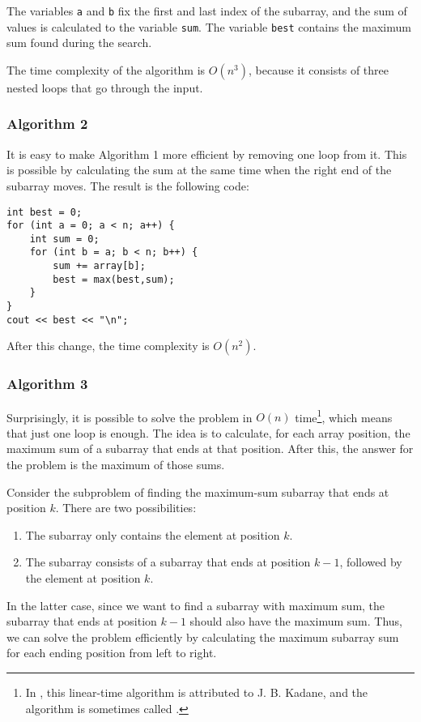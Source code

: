 The variables \texttt{a} and \texttt{b} fix the first and
last index of the subarray,
and the sum of values is calculated to the variable \texttt{sum}.
The variable \texttt{best} contains the maximum sum found during the search.

The time complexity of the algorithm is $O(n^3)$,
because it consists of three nested loops
that go through the input.

\subsubsection{Algorithm 2}

It is easy to make Algorithm 1 more efficient
by removing one loop from it.
This is possible by calculating the sum at the same
time when the right end of the subarray moves.
The result is the following code:

\begin{lstlisting}
int best = 0;
for (int a = 0; a < n; a++) {
    int sum = 0;
    for (int b = a; b < n; b++) {
        sum += array[b];
        best = max(best,sum);
    }
}
cout << best << "\n";
\end{lstlisting}
After this change, the time complexity is $O(n^2)$.

\subsubsection{Algorithm 3}

Surprisingly, it is possible to solve the problem
in $O(n)$ time\footnote{In \cite{ben86}, this linear-time algorithm
is attributed to J. B. Kadane, and the algorithm is sometimes
called  .}, which means
that just one loop is enough.
The idea is to calculate, for each array position,
the maximum sum of a subarray that ends at that position.
After this, the answer for the problem is the
maximum of those sums.

Consider the subproblem of finding the maximum-sum subarray
that ends at position $k$.
There are two possibilities:
\begin{enumerate}
\item The subarray only contains the element at position $k$.
\item The subarray consists of a subarray that ends
at position $k-1$, followed by the element at position $k$.
\end{enumerate}

In the latter case, since we want to
find a subarray with maximum sum,
the subarray that ends at position $k-1$
should also have the maximum sum.
Thus, we can solve the problem efficiently
by calculating the maximum subarray sum
for each ending position from left to right.


